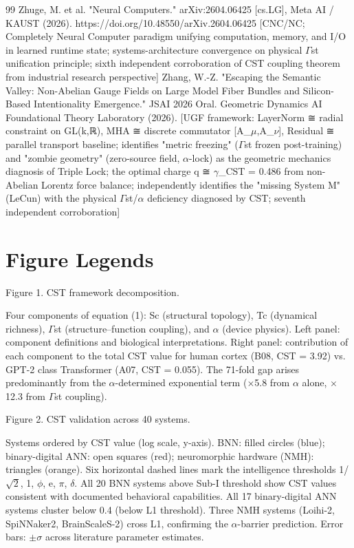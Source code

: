 \documentclass[a4paper,12pt]{article}
\begin{document}
\begin{thebibliography}{99}
 Zhuge, M. et al. "Neural Computers." arXiv:2604.06425 [cs.LG], Meta AI / KAUST (2026). https://doi.org/10.48550/arXiv.2604.06425 [CNC/NC; Completely Neural Computer paradigm unifying computation, memory, and I/O in learned runtime state; systems-architecture convergence on physical $\Gamma$st unification principle; sixth independent corroboration of CST coupling theorem from industrial research perspective]
 Zhang, W.-Z. "Escaping the Semantic Valley: Non-Abelian Gauge Fields on Large Model Fiber Bundles and Silicon-Based Intentionality Emergence." JSAI 2026 Oral. Geometric Dynamics AI Foundational Theory Laboratory (2026). [UGF framework: LayerNorm ≅ radial constraint on GL(k,ℝ), MHA ≅ discrete commutator [A_$\mu$,A_$\nu$], Residual ≅ parallel transport baseline; identifies "metric freezing" ($\Gamma$st frozen post-training) and "zombie geometry" (zero-source field, $\alpha$-lock) as the geometric mechanics diagnosis of Triple Lock; the optimal charge q ≅ $\gamma$_CST = 0.486 from non-Abelian Lorentz force balance; independently identifies the "missing System M" (LeCun) with the physical $\Gamma$st/$\alpha$ deficiency diagnosed by CST; seventh independent corroboration]
\end{thebibliography}

\section*{Figure Legends}
Figure 1. CST framework decomposition.

Four components of equation (1): Sc (structural topology), Tc (dynamical richness), $\Gamma$st (structure--function coupling), and $\alpha$ (device physics). Left panel: component definitions and biological interpretations. Right panel: contribution of each component to the total CST value for human cortex (B08, CST = 3.92) vs. GPT-2 class Transformer (A07, CST = 0.055). The 71-fold gap arises predominantly from the $\alpha$-determined exponential term ($\times$5.8 from $\alpha$ alone, $\times$12.3 from $\Gamma$st coupling).

Figure 2. CST validation across 40 systems.

Systems ordered by CST value (log scale, y-axis). BNN: filled circles (blue); binary-digital ANN: open squares (red); neuromorphic hardware (NMH): triangles (orange). Six horizontal dashed lines mark the intelligence thresholds {1/$\sqrt{2}$, 1, $\phi$, e, $\pi$, $\delta$}. All 20 BNN systems above Sub-I threshold show CST values consistent with documented behavioral capabilities. All 17 binary-digital ANN systems cluster below 0.4 (below L1 threshold). Three NMH systems (Loihi-2, SpiNNaker2, BrainScaleS-2) cross L1, confirming the $\alpha$-barrier prediction. Error bars: $\pm$$\sigma$ across literature parameter estimates.
\end{document}
